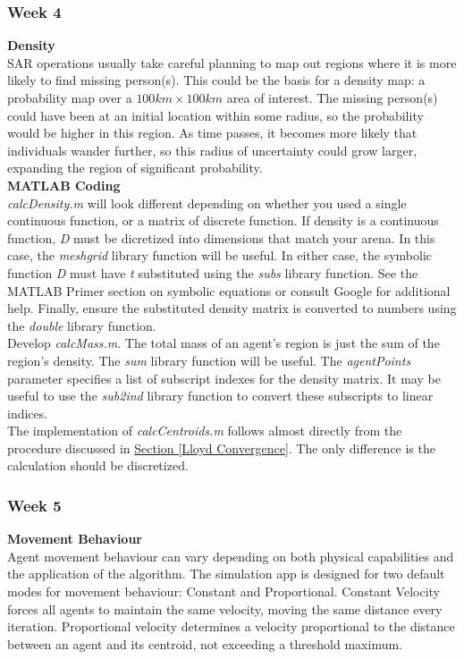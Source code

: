 \documentclass[../CourseManual.tex]{subfiles}
\begin{document}
\subsubsection{Week 4}
\textbf{Density}\\
SAR operations usually take careful planning to map out regions where it is more likely to find missing person(s). This could be the basis for a density map: a probability map over a $100km \times 100km$ area of interest. The missing person(s) could have been at an initial location within some radius, so the probability would be higher in this region. As time passes, it becomes more likely that individuals wander further, so this radius of uncertainty could grow larger, expanding the region of significant probability. \\

\textbf{MATLAB Coding}\\
\textit{calcDensity.m} will look different depending on whether you used a single continuous function, or a matrix of discrete function. If density is a continuous function, \textit{D} must be dicretized into dimensions that match your arena. In this case, the \textit{meshgrid} library function will be useful. In either case, the symbolic function \textit{D} must have \textit{t} substituted using the \textit{subs} library function. See the MATLAB Primer section on symbolic equations or consult Google for additional help. Finally, ensure the substituted density matrix is converted to numbers using the \textit{double} library function. \\

Develop \textit{calcMass.m}. The total mass of an agent's region is just the sum of the region's density. The \textit{sum} library function will be useful. The \textit{agentPoints} parameter specifies a list of subscript indexes for the density matrix. It may be useful to use the \textit{sub2ind} library function to convert these subscripts to linear indices.\\

The implementation of \textit{calcCentroids.m} follows almost directly from the procedure discussed in \hyperref[Lloyd Convergence]{Section \ref{Lloyd Convergence}}. The only difference is the calculation should be discretized.

\subsubsection{Week 5}
\textbf{Movement Behaviour}\\
Agent movement behaviour can vary depending on both physical capabilities and the application of the algorithm. The simulation app is designed for two default modes for movement behaviour: Constant and Proportional. Constant Velocity forces all agents to maintain the same velocity, moving the same distance every iteration. Proportional velocity determines a velocity proportional to the distance between an agent and its centroid, not exceeding a threshold maximum. \\
\end{document}
